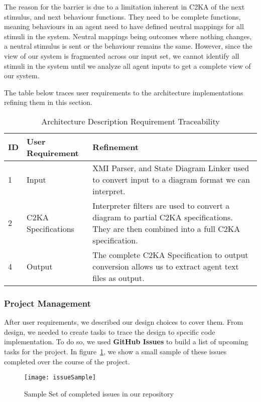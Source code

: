 The reason for the barrier is due to a limitation inherent in C2KA of the next stimulus, and next behaviour functions.
They need to be complete functions,
meaning behaviours in an agent need to have defined neutral mappings for all stimuli in the system.
Neutral mappings being outcomes where nothing changes, a neutral stimulus is sent or the behaviour remains the same.
However, since the view of our system is fragmented across our input set,
we cannot identify all stimuli in the system until we analyze all agent inputs to get a complete view of our system.


The table below traces user requirements to the architecture implementations refining them in this section.
\begin{table}[htbp]
    \centering
    \caption{Architecture Description Requirement Traceability}\label{tab:arch-description-table}
    \begin{tabularx}{\textwidth}{| l | l | X |}
        \hline
        \textbf{ID} & \textbf{User Requirement} & \textbf{Refinement} \\
        \hline
        1 & Input & XMI Parser, and State Diagram Linker used to convert input to a diagram format we can interpret. \\ \hline
        2 & C2KA Specifications & Interpreter filters are used to convert a diagram to partial C2KA specifications.
        They are then combined into a full C2KA specification. \\ \hline
        4 & Output & The complete C2KA Specification to output conversion allows us to extract agent text files as output.  \\ \hline
    \end{tabularx}
\end{table}

\newpage
\subsubsection{Project Management}\label{subsubsec:proj-mngmnt}
After user requirements, we described our design choices to cover them.
From design, we needed to create tasks to trace the design to specific code implementation.
To do so, we used \textbf{GitHub Issues} to build a list of upcoming tasks for the project.
In figure~\ref{fig:sampleIssueList}, we show a small sample of these issues completed over the course of the project.
\begin{figure}[h]
    \centering
    \texttt{[image: issueSample]}
    \caption{Sample Set of completed issues in our repository}
    \label{fig:sampleIssueList}
\end{figure}

